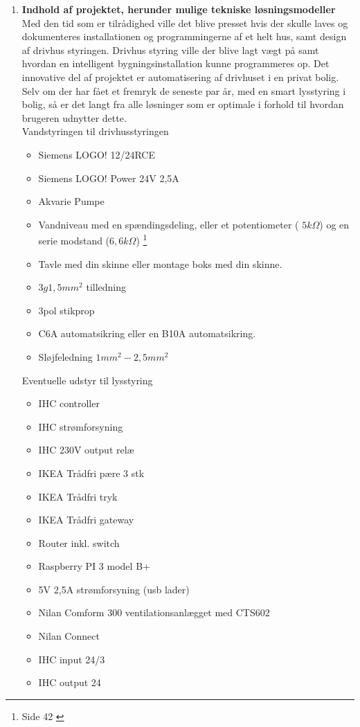 \begin{enumerate}
    \item \textbf{Indhold af projektet, herunder mulige tekniske løsningsmodeller} \\ 
    Med den tid som er tilrådighed ville det blive presset hvis der skulle laves og dokumenteres installationen og programmingerne af et helt hus, samt design af drivhus styringen. 
    Drivhus styring ville der blive lagt vægt på samt hvordan en intelligent bygningsinstallation kunne programmeres op.
    Det innovative del af projektet er automatisering af drivhuset i en privat bolig. Selv om der har fået et fremryk de seneste par år, med en smart lysstyring i bolig, så er det langt fra alle løsninger som er optimale i forhold til hvordan brugeren udnytter dette. 
    \\
    Vandstyringen til drivhusstyringen
    \begin{itemize}
        \item Siemens LOGO! 12/24RCE
        \item Siemens LOGO! Power 24V 2,5A
        \item Akvarie Pumpe
        \item Vandniveau med en spændingsdeling, eller et potentiometer ( $5k\Omega$) og en serie modstand ($6,6k\Omega$) \footnote{Side 42 \cite{logo_sm} }
        \item Tavle med din skinne eller montage boks med din skinne.
        \item $3g1,5mm^2$ tilledning
        \item 3pol stikprop
        \item C6A automatsikring eller en B10A automatsikring.
        \item Sløjfeledning $1mm^2 - 2,5mm^2$
    \end{itemize}
    Eventuelle udstyr til lysstyring
    \begin{itemize}
        \item IHC controller
        \item IHC strømforsyning
        \item IHC 230V output relæ
        \item IKEA Trådfri pære 3 stk
        \item IKEA Trådfri tryk
        \item IKEA Trådfri gateway
        \item Router inkl. switch
        \item Raspberry PI 3 model B+
        \item 5V 2,5A strømforsyning (usb lader)
        \item Nilan Comform 300 ventilationsanlægget med CTS602
        \item Nilan Connect 
        \item IHC input 24/3
        \item IHC output 24
    \end{itemize}


\end{enumerate}
